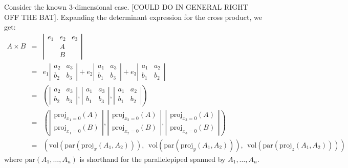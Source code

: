 \documentclass[10pt]{article}
\begin{document}
Consider the known 3-dimensional case. [COULD DO IN GENERAL RIGHT OFF THE BAT].
Expanding the determinant expression for the cross product, we get:
\begin{eqnarray}
\label{eq:gcpdet}
A \times B & = & 
\left|
\begin{array}{ccc}
e_1 & e_2 & e_3 \\
    & A \\
    & B
\end{array}
\right|\\
& = &
e_1 
\left| 
\begin{array}{cc} 
a_2 & a_3 \\
b_2 & b_3
\end{array}
\right|
+ e_2 
\left| 
\begin{array}{cc} 
a_1 & a_3 \\
b_1 & b_3
\end{array}
\right|
+
e_3 
\left| 
\begin{array}{cc} 
a_1 & a_2 \\
b_1 & b_2
\end{array}
\right| \\
& = & ( 
\left| 
\begin{array}{cc} 
a_2 & a_3 \\
b_2 & b_3
\end{array}
\right|
, 
\left| 
\begin{array}{cc} 
a_1 & a_3 \\
b_1 & b_3
\end{array}
\right|
, 
\left| 
\begin{array}{cc} 
a_1 & a_2 \\
b_1 & b_2
\end{array}
\right|
)\\
& = & (
\label{eq:gcpproj}
\left|
\begin{array}{c}
\mbox{proj}_{x_1=0}(A)\\
\mbox{proj}_{x_1=0}(B)
\end{array}
\right|
,
\left|
\begin{array}{c}
\mbox{proj}_{x_2=0}(A)\\
\mbox{proj}_{x_2=0}(B)
\end{array}
\right|
,
\left|
\begin{array}{c}
\mbox{proj}_{x_3=0}(A)\\
\mbox{proj}_{x_3=0}(B)
\end{array}
\right|
)\\
& = &
(\mbox{vol} (\mbox{par} (\mbox{proj}_x (A_1,A_2))),\ \ 
\mbox{vol} (\mbox{par} (\mbox{proj}_y (A_1,A_2))),\ \ 
\mbox{vol} (\mbox{par} (\mbox{proj}_z (A_1,A_2))))
\end{eqnarray}
where $\mbox{par}(A_1,\ldots,A_n)$ 
is shorthand for the parallelepiped spanned by $A_1,\ldots,A_n$.
\end{document}
